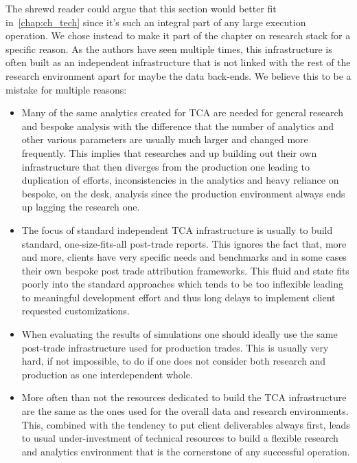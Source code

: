 The shrewd reader could argue that this section would better fit in~\ref{chap:ch_tech} since it's such an integral part of any large execution operation. We chose instead to make it part of the chapter on research stack for a specific reason. As the authors have seen multiple times, this infrastructure is often built as an independent infrastructure that is not linked with the rest of the research environment apart for maybe the data back-ends. We believe this to be a mistake for multiple reasons:
\begin{itemize}
\item Many of the same analytics created for TCA are needed for general research and bespoke analysis with the difference that the number of analytics and other various parameters are usually much larger and changed more frequently. This implies that researches and up building out their own infrastructure that then diverges from the production one leading to duplication of efforts, inconsistencies in the analytics and heavy reliance on bespoke, on the desk, analysis since the production environment always ends up lagging the research one.
\item The focus of standard independent TCA infrastructure is usually to build standard, one-size-fits-all post-trade reports. This ignores the fact that, more and more, clients have very specific needs and benchmarks and in some cases their own bespoke post trade attribution frameworks.  This fluid and state fits poorly into the standard approaches which tends to be too inflexible leading to meaningful development effort and thus long delays to implement client requested customizations.
\item When evaluating the results of simulations one should ideally use the same post-trade infrastructure used for production trades. This is usually very hard, if not impossible, to do if one does not consider both research and production as one interdependent whole.
\item More often than not the resources dedicated to build the TCA infrastructure are the same as the ones used for the overall data and research environments. This, combined with the tendency to put client deliverables always first, leads to usual under-investment of technical resources to build a flexible research and analytics environment that is the cornerstone of any successful operation.
\end{itemize}


